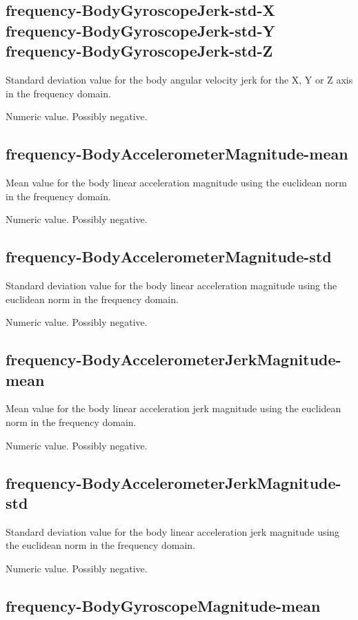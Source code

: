 \documentclass[a4paper,10pt]{report}
\begin{document}
\subsection*{frequency-BodyGyroscopeJerk-std-X\\frequency-BodyGyroscopeJerk-std-Y\\frequency-BodyGyroscopeJerk-std-Z} 

Standard deviation value for the body angular velocity jerk for the X, Y or Z axis in the frequency domain.

Numeric value. Possibly negative.

\subsection*{frequency-BodyAccelerometerMagnitude-mean} 

Mean value for the body linear acceleration magnitude using the euclidean norm in the frequency domain.

Numeric value. Possibly negative.

\subsection*{frequency-BodyAccelerometerMagnitude-std} 

Standard deviation value for the body linear acceleration magnitude using the euclidean norm in the frequency domain.

Numeric value. Possibly negative.

\subsection*{frequency-BodyAccelerometerJerkMagnitude-mean} 

Mean value for the body linear acceleration jerk magnitude using the euclidean norm in the frequency domain.

Numeric value. Possibly negative.

\subsection*{frequency-BodyAccelerometerJerkMagnitude-std} 

Standard deviation value for the body linear acceleration jerk magnitude using the euclidean norm in the frequency domain.

Numeric value. Possibly negative.

\subsection*{frequency-BodyGyroscopeMagnitude-mean} 
\end{document}

